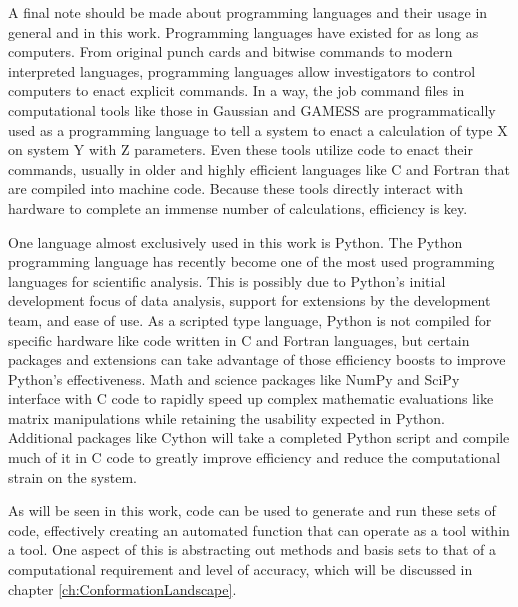 A final note should be made about programming languages and their usage in general and in this work.
Programming languages have existed for as long as computers.
From original punch cards and bitwise commands to modern interpreted languages, programming languages allow investigators to control computers to enact explicit commands.
In a way, the job command files in computational tools like those in Gaussian and GAMESS are programmatically used as a programming language to tell a system to enact a calculation of type X on system Y with Z parameters.
Even these tools utilize code to enact their commands, usually in older and highly efficient languages like C and Fortran that are compiled into machine code.
Because these tools directly interact with hardware to complete an immense number of calculations, efficiency is key.

One language almost exclusively used in this work is Python.\cite{Python} 
The Python programming language has recently become one of the most used programming languages for scientific analysis.
This is possibly due to Python's initial development focus of data analysis, support for extensions by the development team, and ease of use.
As a scripted type language, Python is not compiled for specific hardware like code written in C and Fortran languages, but certain packages and extensions can take advantage of those efficiency boosts to improve Python's effectiveness.
Math and science packages like NumPy\cite{NumPy} and SciPy\cite{SciPy} interface with C code to rapidly speed up complex mathematic evaluations like matrix manipulations while retaining the usability expected in Python.
Additional packages like Cython\cite{Cython} will take a completed Python script and compile much of it in C code to greatly improve efficiency and reduce the computational strain on the system.

As will be seen in this work, code can be used to generate and run these sets of code, effectively creating an automated function that can operate as a tool within a tool. 
One aspect of this is abstracting out methods and basis sets to that of a computational requirement and level of accuracy, which will be discussed in chapter \ref{ch:ConformationLandscape}.
















